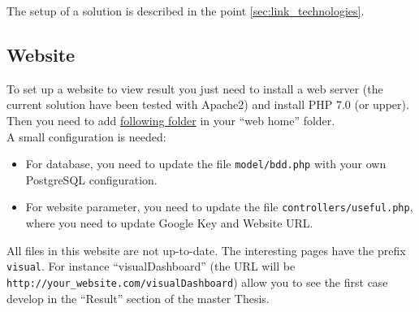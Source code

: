 \documentclass[a4paper,12pt]{article}
\begin{document}
        The setup of a solution is described in the point \ref{sec:link_technologies}.
        
        
    \subsection{Website}
        \label{sec:webiste}
        To set up a website to view result you just need to install a web server (the current solution have been tested with Apache2) and install PHP 7.0 (or upper).\\
        
        Then you need to add \href{https://github.com/detobel36/MobilityDBComparison/tree/master/Website}{following folder} in your ``web home'' folder.\\
        
        A small configuration is needed:
        \begin{itemize}
            \item For database, you need to update the file \verb|model/bdd.php| with your own PostgreSQL configuration.
            \item For website parameter, you need to update the file \verb|controllers/useful.php|, where you need to update Google Key and Website URL.
        \end{itemize}
        
        All files in this website are not up-to-date. The interesting pages have the prefix \verb|visual|. For instance ``visualDashboard'' (the URL will be \verb|http://your_website.com/visualDashboard|) allow you to see the first case develop in the ``Result'' section of the master Thesis.\\
        
\end{document}
